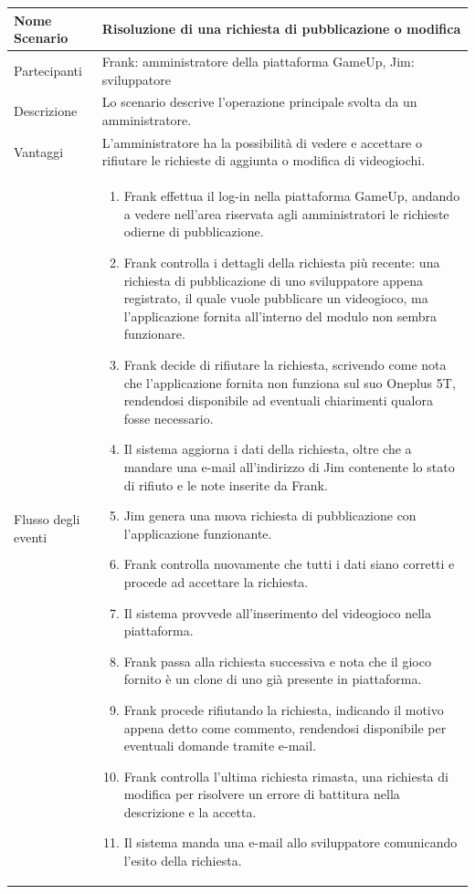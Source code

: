 	\small\begin{tabular}{|| l | p{30em} ||} 
	\hline
	Nome Scenario & Risoluzione di una richiesta di pubblicazione o modifica\\
	\hline
	Partecipanti & Frank: amministratore della piattaforma GameUp,
	Jim: sviluppatore\\
	\hline
	Descrizione & Lo scenario descrive l’operazione principale svolta da un amministratore.\\
	\hline
	Vantaggi & L’amministratore ha la possibilità di vedere e accettare o rifiutare le richieste di aggiunta o modifica di videogiochi.\\
	\hline
	Flusso degli eventi &
	\begin{enumerate}
		\item Frank effettua il log-in nella piattaforma GameUp, andando a vedere nell’area riservata agli amministratori le richieste odierne di pubblicazione.
		\item Frank controlla i dettagli della richiesta più recente: una richiesta di pubblicazione di uno sviluppatore appena registrato, il quale vuole pubblicare un videogioco, ma l’applicazione fornita all’interno del modulo non sembra funzionare.
		\item Frank decide di rifiutare la richiesta, scrivendo come nota che l’applicazione fornita non funziona sul suo Oneplus 5T, rendendosi disponibile ad eventuali chiarimenti qualora fosse necessario.
		\item Il sistema aggiorna i dati della richiesta, oltre che a mandare una e-mail all’indirizzo di Jim contenente lo stato di rifiuto e le note inserite da Frank.
		\item Jim genera una nuova richiesta di pubblicazione con l’applicazione funzionante.
		\item Frank controlla nuovamente che tutti i dati siano corretti e procede ad accettare la richiesta.
		\item Il sistema provvede all’inserimento del videogioco nella piattaforma.
		\item Frank passa alla richiesta successiva e nota che il gioco fornito è un clone di uno già presente in piattaforma.
		\item Frank procede rifiutando la richiesta, indicando il motivo appena detto come commento, rendendosi disponibile per eventuali domande tramite e-mail.
		\item Frank controlla l’ultima richiesta rimasta, una richiesta di modifica per risolvere un errore di battitura nella descrizione e la accetta.
		\item Il sistema manda una e-mail allo sviluppatore comunicando l’esito della richiesta.
	\end{enumerate} \\
	\hline
	\end{tabular}

